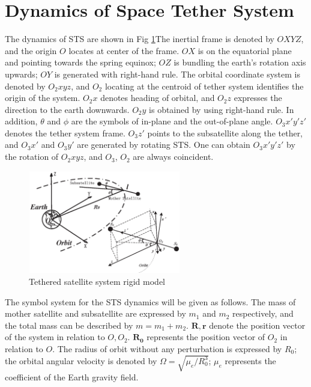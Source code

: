 \documentclass[conference]{IEEEtran}
\theoremstyle{plain}
\begin{document}
\section{Dynamics of Space Tether System}\label{sec:dynamics}
The dynamics of STS are shown in Fig \ref{fig:model}The inertial frame is denoted by $OXYZ$, and the origin $O$ locates at center of the frame. $OX$ is on the equatorial plane and pointing towards the spring equinox; $OZ$ is bundling the earth's rotation axis upwards; $OY$ is generated with right-hand rule. The orbital coordinate system is denoted by $O_2xyz$, and $O_2$ locating at the centroid of tether system identifies the origin of the system. $O_2x$ denotes heading of orbital, and $O_2z$ expresses the direction to the earth downwards. $O_2y$ is obtained by using right-hand rule. In addition, $\theta$ and $\phi$ are the symbols of in-plane and the out-of-plane angle. $O_3x'y'z'$ denotes the tether system frame. $O_3z'$ points to the subsatellite along the tether, and $O_3x'$ and $O_3y'$ are generated by rotating STS. One can obtain $O_3x'y'z'$  by the rotation of $O_2xyz$, and $O_3$, $O_2$ are always coincident.\par
\begin{figure}[H]
\centering
\includegraphics[width=6.68cm,height=4.49cm]{orbit_for_conference.eps}
\caption{Tethered satellite system rigid model}\label{fig:model}
\end{figure}
The symbol system for the STS dynamics will be given as follows. The mass of mother satellite and subsatellite are expressed by $m_1$ and $m_2$ respectively, and the total mass can be described by $m=m_1+m_2$. $\bm{R},\bm{r}$ denote the position vector of the system in relation to $O,O_2$. $\bm{R_0}$ represents the position vector of $O_2$ in relation to $O$. The radius of orbit without any perturbation is expressed by $R_0$; the orbital angular velocity is denoted by $\Omega=\sqrt{\mu_e/R_0^3}$; $\mu_e$ represents the coefficient of the Earth gravity field.\par
\end{document}
